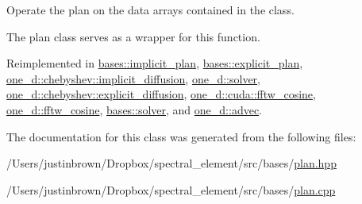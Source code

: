 Operate the plan on the data arrays contained in the class. 



 The plan class serves as a wrapper for this function. 

Reimplemented in \hyperlink{classbases_1_1implicit__plan_a564bcb2be88ca9abe77c981d77d58d74}{bases\-::implicit\-\_\-plan}, \hyperlink{classbases_1_1explicit__plan_a21bcba4d429590031bba41ee2a48a4ef}{bases\-::explicit\-\_\-plan}, \hyperlink{classone__d_1_1chebyshev_1_1implicit__diffusion_a5da5289b943a5d3384c7b0341f890125}{one\-\_\-d\-::chebyshev\-::implicit\-\_\-diffusion}, \hyperlink{classone__d_1_1solver_a7c28bd733cb3c3849afe1773974eb4f6}{one\-\_\-d\-::solver}, \hyperlink{classone__d_1_1chebyshev_1_1explicit__diffusion_a2a6de638d550ecd781c74d7ef35dd866}{one\-\_\-d\-::chebyshev\-::explicit\-\_\-diffusion}, \hyperlink{classone__d_1_1cuda_1_1fftw__cosine_a557fc154a9e6ffe9a8179667b66901dc}{one\-\_\-d\-::cuda\-::fftw\-\_\-cosine}, \hyperlink{classone__d_1_1fftw__cosine_aa8b0befe7b047feb004b2c41644a2fa4}{one\-\_\-d\-::fftw\-\_\-cosine}, \hyperlink{classbases_1_1solver_a8adf4c428bf4322a664c811073b491e1}{bases\-::solver}, and \hyperlink{classone__d_1_1advec_a1811538aec2a23cc27ef87fbce5dec8c}{one\-\_\-d\-::advec}.



The documentation for this class was generated from the following files\-:\begin{DoxyCompactItemize}
\item 
/\-Users/justinbrown/\-Dropbox/spectral\-\_\-element/src/bases/\hyperlink{plan_8hpp}{plan.\-hpp}\item 
/\-Users/justinbrown/\-Dropbox/spectral\-\_\-element/src/bases/\hyperlink{plan_8cpp}{plan.\-cpp}\end{DoxyCompactItemize}
